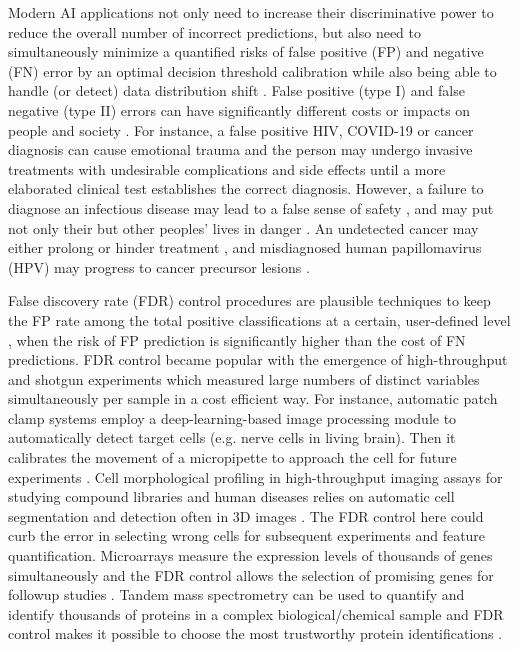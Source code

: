 \documentclass{article}
\begin{document}
Modern AI applications not only need to increase their discriminative power to reduce the overall number of incorrect predictions, but also need to simultaneously minimize a quantified risks of false positive (FP) and negative (FN) error by an optimal decision threshold calibration while also being able to handle (or detect) data distribution shift \cite{feng2022clinical, al2023artificial}. False positive (type I) and false negative (type II) errors can have significantly different costs or impacts on people and society \cite{wynants2019three}. For instance, a false positive HIV, COVID-19 or cancer diagnosis can cause emotional trauma and the person may undergo invasive treatments with undesirable complications and side effects \cite{newman2021rate, salz2010meta, Tosteson2014Consequences, xu2016frequency} until a more elaborated clinical test establishes the correct diagnosis. However, a failure to diagnose an infectious disease may lead to a false sense of safety \cite{mouliou2021false}, and may put not only their but other peoples' lives in danger \cite{woloshin2020false}. An undetected cancer may either prolong or hinder treatment \cite{bradley2021interpreting}, and misdiagnosed human papillomavirus (HPV) may progress to cancer precursor lesions \cite{macios2022false,pinsky2015principles}. 


False discovery rate (FDR) control procedures are plausible techniques to keep the FP rate among the total positive classifications at a certain, user-defined level \cite{Benjamini1995Controlling}, when the risk of FP prediction is significantly higher than the cost of FN predictions. FDR control became popular with the emergence of high-throughput and shotgun experiments which measured large numbers of distinct variables simultaneously per sample in a cost efficient way. For instance, automatic patch clamp systems employ a deep-learning-based image processing module to automatically detect target cells (e.g. nerve cells in living brain). Then it calibrates the movement of a micropipette to approach the cell for future experiments \cite{koos2021automatic}. Cell morphological profiling in high-throughput imaging assays for studying compound libraries and human diseases \cite{moshkov2024learning} relies on automatic cell segmentation and detection often in 3D images \cite{falk2019u}. The FDR control here could curb the error in selecting wrong cells for subsequent experiments and feature quantification.  Microarrays measure the expression levels of thousands of genes simultaneously and the FDR control allows the selection of promising genes for followup studies \cite{storey2002direct,storey2003statistical,barber2015controlling}. Tandem mass spectrometry can be used to quantify and identify thousands of proteins in a complex biological/chemical sample and FDR control makes it possible to choose the most trustworthy protein identifications \cite{elias2007target}.
\end{document}
